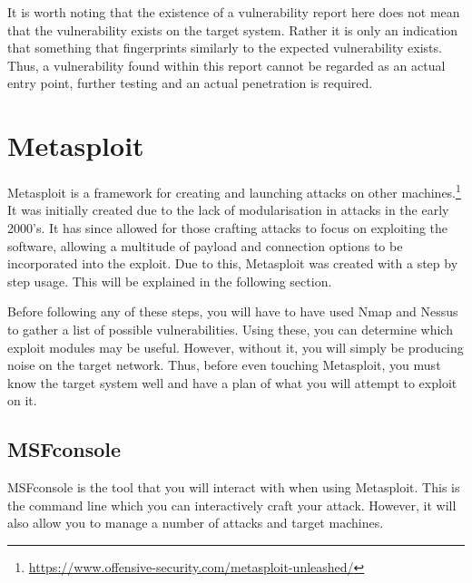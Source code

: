 \documentclass[a4paper,11pt]{report}
\begin{document}
			It is worth noting that the existence of a vulnerability report here does not mean that the vulnerability exists on the target system. 
			Rather it is only an indication that something that fingerprints similarly to the expected vulnerability exists. 
			Thus, a vulnerability found within this report cannot be regarded as an actual entry point, further testing and an actual penetration is required. 
	\section{Metasploit}
		Metasploit is a framework for creating and launching attacks on other machines.\footnote{\url{https://www.offensive-security.com/metasploit-unleashed/}} 
		It was initially created due to the lack of modularisation in attacks in the early 2000's. 
		It has since allowed for those crafting attacks to focus on exploiting the software, allowing a multitude of payload and connection options to be incorporated into the exploit. 
		Due to this, Metasploit was created with a step by step usage. 
		This will be explained in the following section. 

		Before following any of these steps, you will have to have used Nmap and Nessus to gather a list of possible vulnerabilities. 
		Using these, you can determine which exploit modules may be useful. 
		However, without it, you will simply be producing noise on the target network. 
		Thus, before even touching Metasploit, you must know the target system well and have a plan of what you will attempt to exploit on it. 
		
		\subsection{MSFconsole}
			MSFconsole is the tool that you will interact with when using Metasploit. 
			This is the command line which you can interactively craft your attack. 
			However, it will also allow you to manage a number of attacks and target machines. 
\end{document}
